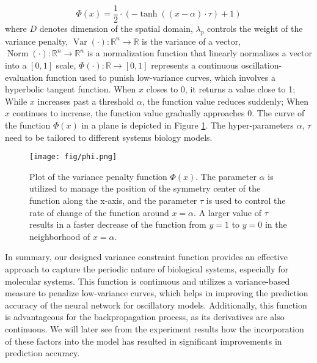 \begin{equation}
\Phi\left(x\right)=\dfrac{1}{2} \cdot (- \tanh\left(\left(x - \alpha\right) \cdot \tau\right) + 1)
\end{equation}
where $D$ denotes dimension of the spatial domain, $\lambda_{p}$ controls the weight of the variance penalty, $\operatorname{Var}\left(\cdot\right): \mathbb{R}^{n}\rightarrow \mathbb{R}$ is the variance of a vector, $\operatorname{Norm}\left(\cdot\right): \mathbb{R}^{n}\rightarrow \mathbb{R}^{n}$ is a normalization function that linearly normalizes a vector into a $[0,1]$ scale, $\Phi \left(\cdot\right): \mathbb{R}\rightarrow [0,1]$ represents a continuous oscillation-evaluation function used to punish low-variance curves, which involves a hyperbolic tangent function. When $x$ closes to $0$, it returns a value close to 1; While $x$ increases past a threshold $\alpha$, the function value reduces suddenly; When $x$ continues to increase, the function value gradually approaches $0$. The curve of the function $\Phi(x)$ in a plane is depicted in Figure \ref{fig:phi}. The hyper-parameters $\alpha$, $\tau$ need to be tailored to different systems biology models.

\begin{figure}[h]
\centering
\texttt{[image: fig/phi.png]}
\caption[Plot of the variance penalty function] {Plot of the variance penalty function $\Phi\left(x\right)$. The parameter $\alpha$ is utilized to manage the position of the symmetry center of the function along the x-axis, and the parameter $\tau$ is used to control the rate of change of the function around $x=\alpha$. A larger value of $\tau$ results in a faster decrease of the function from $y=1$ to $y=0$ in the neighborhood of $x=\alpha$.}
\label{fig:phi}
\end{figure}
In summary, our designed variance constraint function provides an effective approach to capture the periodic nature of biological systems, especially for molecular systems. This function is continuous and utilizes a variance-based measure to penalize low-variance curves, which helps in improving the prediction accuracy of the neural network for oscillatory models. Additionally, this function is advantageous for the backpropagation process, as its derivatives are also continuous. We will later see from the experiment results how the incorporation of these factors into the model has resulted in significant improvements in prediction accuracy.



